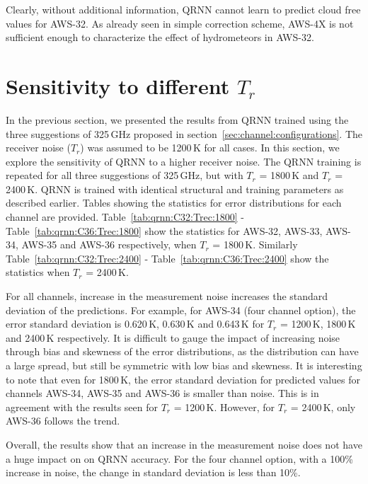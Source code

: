 \documentclass[12pt]{article}
\begin{document}
Clearly, without additional information, QRNN cannot learn to predict cloud free values for AWS-32.
As already seen in simple correction scheme, AWS-4X is not sufficient enough to characterize the effect of hydrometeors in AWS-32. 

\section{Sensitivity to different $T_r$}
\label{sec:tr}
%
In the previous section, we presented the results from QRNN trained using the three suggestions of 325\,GHz proposed in section~\ref{sec:channel:configurations}. The receiver noise ($T_r$) was assumed to be 1200\,K for all cases. In this section, we explore the sensitivity of QRNN to a higher receiver noise. The QRNN training is repeated for all three suggestions of 325\,GHz, but with $T_r$ = 1800\,K and $T_r$ = 2400\,K. QRNN is trained with identical structural and training parameters as described earlier. Tables showing the statistics for error distributions for each channel are provided. Table~\ref{tab:qrnn:C32:Trec:1800} - Table~\ref{tab:qrnn:C36:Trec:1800} show the statistics for AWS-32, AWS-33, AWS-34, AWS-35 and AWS-36 respectively, when $T_r$ = 1800\,K.  Similarly Table~\ref{tab:qrnn:C32:Trec:2400} - Table~\ref{tab:qrnn:C36:Trec:2400} show the statistics when $T_r$ = 2400\,K. 

For all channels, increase in the measurement noise increases the standard deviation of the predictions. For example, for AWS-34 (four channel option), the error standard deviation is 0.620\,K, 0.630\,K and 0.643\,K for $T_r$ = 1200\,K, 1800\,K and 2400\,K respectively. It is difficult to gauge the impact of increasing noise through bias and skewness of the error distributions, as the distribution can have a large spread, but still be symmetric with low bias and skewness. It is interesting to note that even for 1800\,K, the error standard deviation for predicted values for channels AWS-34, AWS-35 and AWS-36 is smaller than noise. This is in agreement with the results seen for $T_r$ = 1200\,K. However, for $T_r$ = 2400\,K, only AWS-36 follows the trend.

Overall, the results show that an increase in the measurement noise does not have a huge impact on on QRNN accuracy. For the four channel option, with a 100\% increase in noise, the change in standard deviation is less than 10\%. 
\end{document}
